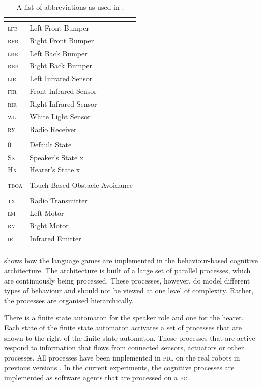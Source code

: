 \begin{table}
\centering
\begin{tabular}{>{\scshape}ll}
\lsptoprule
\multicolumn{2}{c}{{\sc sensors}}\\
\midrule
lfb & Left Front Bumper\\
rfb & Right Front Bumper\\
lbb & Left Back Bumper\\
rbb & Right Back Bumper\\
lir & Left Infrared Sensor\\
fir & Front Infrared Sensor\\
rir & Right Infrared Sensor\\
wl & White Light Sensor\\
rx & Radio Receiver\\
\midrule
\multicolumn{2}{c}{{\sc finite state automata}}\\
\midrule
0 & Default State\\
{\rmfamily Sx} & Speaker's State x\\
{\rmfamily Hx} & Hearer's State x\\
\midrule
\multicolumn{2}{c}{{\sc processes}}\\
\midrule
tboa & Touch-Based Obstacle Avoidance\\
\midrule
\multicolumn{2}{c}{{\sc actuators}}\\
\midrule
tx & Radio Transmitter\\
lm & Left Motor\\
rm & Right Motor\\
ir & Infrared Emitter\\
\lspbottomrule
\end{tabular}
\caption{A list of abbreviations as used in .}
\label{t:abbr}
\end{table}


 shows how the language games are implemented in the behaviour-based cognitive architecture. The architecture is built of a large set of parallel processes, which are continuously being processed. These processes, however, do model different types of behaviour and should not be viewed at one level of complexity. Rather, the processes are organised hierarchically. 

\newpage
There is a finite state automaton for the speaker role and one for the hearer. Each state of the finite state automaton activates a set of processes that are shown to the right of the finite state automaton. Those processes that are active respond to information that flows from connected sensors, actuators or other processes. All processes have been implemented in {\scshape pdl} on the real robots in previous versions \citep{steelsvogt:1997}. In the current experiments, the cognitive processes are implemented as software agents that are processed on a {\scshape pc}.

